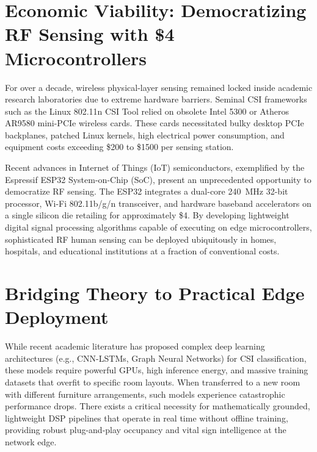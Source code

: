 \section{Economic Viability: Democratizing RF Sensing with \$4 Microcontrollers}
For over a decade, wireless physical-layer sensing remained locked inside academic research laboratories due to extreme hardware barriers. Seminal CSI frameworks such as the Linux 802.11n CSI Tool relied on obsolete Intel 5300 or Atheros AR9580 mini-PCIe wireless cards. These cards necessitated bulky desktop PCIe backplanes, patched Linux kernels, high electrical power consumption, and equipment costs exceeding \$200 to \$1500 per sensing station.

Recent advances in Internet of Things (IoT) semiconductors, exemplified by the Espressif ESP32 System-on-Chip (SoC), present an unprecedented opportunity to democratize RF sensing. The ESP32 integrates a dual-core 240~MHz 32-bit processor, Wi-Fi 802.11b/g/n transceiver, and hardware baseband accelerators on a single silicon die retailing for approximately \$4. By developing lightweight digital signal processing algorithms capable of executing on edge microcontrollers, sophisticated RF human sensing can be deployed ubiquitously in homes, hospitals, and educational institutions at a fraction of conventional costs.

\section{Bridging Theory to Practical Edge Deployment}
While recent academic literature has proposed complex deep learning architectures (e.g., CNN-LSTMs, Graph Neural Networks) for CSI classification, these models require powerful GPUs, high inference energy, and massive training datasets that overfit to specific room layouts. When transferred to a new room with different furniture arrangements, such models experience catastrophic performance drops. There exists a critical necessity for mathematically grounded, lightweight DSP pipelines that operate in real time without offline training, providing robust plug-and-play occupancy and vital sign intelligence at the network edge.
